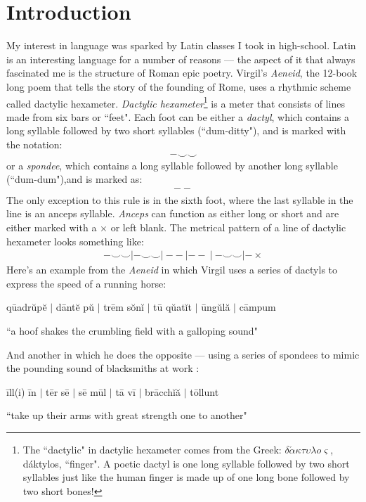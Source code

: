 \documentclass[12pt]{article}
\begin{document}
\section*{Introduction}
My interest in language was sparked by Latin classes I took in high-school. Latin is an interesting language for a number of reasons --- the aspect of it that always fascinated me is the structure of Roman epic poetry. Virgil's \emph{Aeneid}, the 12-book long poem that tells the story of the founding of Rome, uses a rhythmic scheme called dactylic hexameter. \emph{Dactylic hexameter}\footnote{The ``dactylic" in dactylic hexameter comes from the Greek: $\delta  \acute{\alpha} \kappa \tau \upsilon \lambda o \varsigma$, d\'{a}ktylos, ``finger". A poetic dactyl is one long syllable followed by two short syllables just like the human finger is made up of one long bone followed by two short bones!} is a meter that consists of lines made from six bars or ``feet". Each foot can be either a \emph{dactyl}, which contains a long syllable followed by two short syllables (``dum-ditty"), and is marked with the notation: 
\begin{align*}
- \smallsmile \smallsmile
\end{align*}
or a \emph{spondee}, which contains a long syllable followed by another long syllable (``dum-dum"),and is marked as: 
\begin{align*}
- -
\end{align*} 
The only exception to this rule is in the sixth foot, where the last syllable in the line is an anceps syllable. \emph{Anceps} can function as either long or short and are either marked with a $\times$ or left blank. The metrical pattern of a line of dactylic hexameter looks something like:
\begin{align*}
- \smallsmile \smallsmile | - \smallsmile \smallsmile | - -\ | - - \ | \ - \smallsmile \smallsmile | - \times
\end{align*}
Here's an example from the \emph{Aeneid} in which Virgil uses a series of dactyls to express the speed of a running horse:
\begin{center}
q\={ua}dr\u{u}p\u{e} $\vert$ d\={a}nt\u{e} p\u{u} $\vert$ tr\={e}m s\u{o}n\u{i} $\vert$ t\={u} q\u{ua}t\u{i}t $\vert$ \={u}ng\u{u}l\u{a} $\vert$ c\={a}mpum
\end{center}
\begin{center}
``a hoof shakes the crumbling field with a galloping sound"
\end{center}
And another in which he does the opposite --- using a series of spondees to mimic the pounding sound of blacksmiths at work \cite{wiki_dactylic_hexameter}:
\begin{center}
\={i}ll(i) \={i}n $\vert$ t\={e}r s\={e} $\vert$ s\={e} m\={u}l $\vert$ t\={a} v\={i} $\vert$ br\={a}cch\u{i}\u{a} $\vert$ t\={o}llunt
\end{center}
\begin{center}
``take up their arms with great strength one to another"
\end{center}
\end{document}
